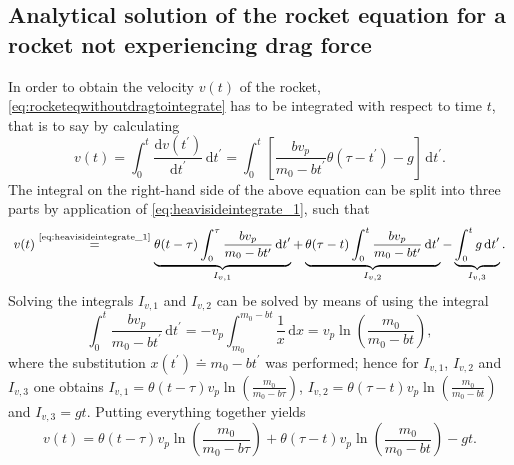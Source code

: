\documentclass[a4paper,11pt]{report}
\begin{document}
\subsection{Analytical solution of the rocket equation for a rocket not experiencing drag force}
In order to obtain the velocity $v(t)$ of the rocket, \cref{eq:rocketeqwithoutdragtointegrate} has to be integrated with respect to time $t$, that is to say by calculating \begin{equation}
v(t) = \int_{0}^{t} \frac{\mathrm{d}v(t^\prime)}{\mathrm{d}t^\prime}\,\mathrm{d}t^\prime = \int_{0}^{t} \left[\frac{bv_p}{m_0-bt^\prime}\theta(\tau-t^\prime)-g\right]\,\mathrm{d}t^\prime.
\end{equation} The integral on the right-hand side of the above equation can be split into three parts by application of \cref{eq:heavisideintegrate_1}, such that \begin{gather}\small\begin{gathered}
v(t) \overset{\text{\cref{eq:heavisideintegrate_1}}}{=} \underbrace{\theta(t-\tau)\int_{0}^{\tau} \frac{bv_p}{m_0-bt^\prime}\,\mathrm{d}t^\prime}_{I_{v,1}} + \underbrace{\theta(\tau-t)\int_{0}^{t}\frac{bv_p}{m_0-bt^\prime}\,\mathrm{d}t^\prime}_{I_{v,2}} - \underbrace{\int_{0}^{t}g\,\mathrm{d}t^\prime}_{I_{v,3}}.
\end{gathered}\end{gather} Solving the integrals $I_{v,1}$ and $I_{v,2}$ can be solved by means of using the integral \begin{equation}
\int_{0}^{t}\frac{bv_p}{m_0-bt^\prime}\,\mathrm{d}t^\prime = -v_p\int_{m_0}^{m_0-bt} \frac{1}{x}\,\mathrm{d}x = v_p \ln\left(\frac{m_0}{m_0-bt}\right),
\end{equation} where the substitution $x(t^\prime) \doteq m_0-bt^\prime$ was performed; hence for $I_{v,1}$, $I_{v,2}$ and $I_{v,3}$ one obtains 
$I_{v,1} = \theta(t-\tau)v_p\ln\left(\frac{m_0}{m_0-b\tau}\right)$, $I_{v,2} = \theta(\tau-t)v_p\ln\left(\frac{m_0}{m_0-bt}\right)$ and $I_{v,3} = gt$. Putting everything together yields \begin{equation}\label{eq:rocketvelocitywithoutdrag}
v(t) = \theta(t-\tau)v_p\ln\left(\frac{m_0}{m_0-b\tau}\right) + \theta(\tau-t)v_p\ln\left(\frac{m_0}{m_0-bt}\right) - gt.
\end{equation}
\end{document}

